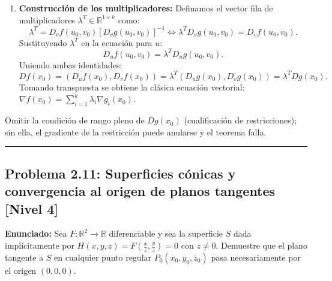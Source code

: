 \documentclass[11pt,a4paper]{article}
\begin{document}
\begin{enumerate}[label=\textbf{\arabic*.}]
\item \textbf{Construcción de los multiplicadores:}
Definamos el vector fila de multiplicadores $\lambda^T \in \mathbb{R}^{1 \times k}$ como:
\begin{equation*}
\lambda^T = D_v f(u_0, v_0) [D_v g(u_0, v_0)]^{-1} \iff \lambda^T D_v g(u_0, v_0) = D_v f(u_0, v_0).
\end{equation*}
Sustituyendo $\lambda^T$ en la ecuación para $u$:
\begin{equation*}
D_u f(u_0, v_0) = \lambda^T D_u g(u_0, v_0).
\end{equation*}
Uniendo ambas identidades:
\begin{equation*}
Df(x_0) = (D_u f(x_0), D_v f(x_0)) = \lambda^T (D_u g(x_0), D_v g(x_0)) = \lambda^T Dg(x_0).
\end{equation*}
Tomando transpuesta se obtiene la clásica ecuación vectorial: $\nabla f(x_0) = \sum_{i=1}^k \lambda_i \nabla g_i(x_0)$.
\end{enumerate}

\begin{trapbox}
Omitir la condición de rango pleno de $Dg(x_0)$ (cualificación de restricciones); sin ella, el gradiente de la restricción puede anularse y el teorema falla.
\end{trapbox}

\vspace{0.5cm}
\hrule
\vspace{0.5cm}

\subsection*{Problema 2.11: Superficies cónicas y convergencia al origen de planos tangentes \hfill \color{primaryblue}\small[Nivel 4]}

\begin{tcolorbox}[colback=white,colframe=gray!40,arc=1mm,boxrule=0.5pt,left=3mm,right=3mm,top=2mm,bottom=2mm]
\textbf{Enunciado:} Sea $F: \mathbb{R}^2 \to \mathbb{R}$ diferenciable y sea la superficie $S$ dada implícitamente por $H(x,y,z) = F\left(\frac{x}{z}, \frac{y}{z}\right) = 0$ con $z \neq 0$. Demuestre que el plano tangente a $S$ en cualquier punto regular $P_0(x_0, y_0, z_0)$ pasa necesariamente por el origen $(0,0,0)$.
\end{tcolorbox}
\end{document}
